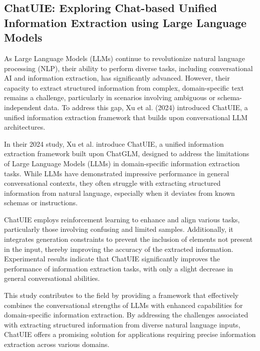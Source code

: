 
\subsection{ChatUIE: Exploring Chat-based Unified Information Extraction using Large Language Models}

\noindent As Large Language Models (LLMs) continue to revolutionize natural language processing (NLP), their ability to perform diverse tasks, including conversational AI and information extraction, has significantly advanced. However, their capacity to extract structured information from complex, domain-specific text remains a challenge, particularly in scenarios involving ambiguous or schema-independent data. To address this gap, Xu et al. (2024) introduced ChatUIE, a unified information extraction framework that builds upon conversational LLM architectures.

In their 2024 study, Xu et al. introduce ChatUIE, a unified information extraction framework built upon ChatGLM, designed to address the limitations of Large Language Models (LLMs) in domain-specific information extraction tasks. While LLMs have demonstrated impressive performance in general conversational contexts, they often struggle with extracting structured information from natural language, especially when it deviates from known schemas or instructions.

ChatUIE employs reinforcement learning to enhance and align various tasks, particularly those involving confusing and limited samples. Additionally, it integrates generation constraints to prevent the inclusion of elements not present in the input, thereby improving the accuracy of the extracted information. Experimental results indicate that ChatUIE significantly improves the performance of information extraction tasks, with only a slight decrease in general conversational abilities.

This study contributes to the field by providing a framework that effectively combines the conversational strengths of LLMs with enhanced capabilities for domain-specific information extraction. By addressing the challenges associated with extracting structured information from diverse natural language inputs, ChatUIE offers a promising solution for applications requiring precise information extraction across various domains.


